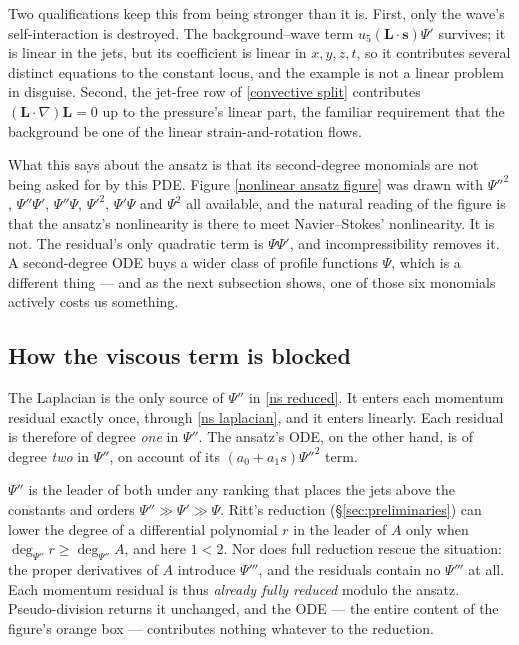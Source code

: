 \documentclass{article}
\theoremstyle{definition}
\theoremstyle{plain}
\begin{document}
\begin{nsexample}
Two qualifications keep this from being stronger than it is.  First, only the
wave's self-interaction is destroyed.  The background--wave term
$u_5(\mathbf{L}\cdot\mathbf{s})\Psi'$ survives; it is linear in the jets, but
its coefficient is linear in $x,y,z,t$, so it contributes several distinct
equations to the constant locus, and the example is not a linear problem in
disguise.  Second, the jet-free row of \eqref{convective split} contributes
$(\mathbf{L}\cdot\nabla)\mathbf{L} = 0$ up to the pressure's linear part, the
familiar requirement that the background be one of the linear
strain-and-rotation flows.

What this says about the ansatz is that its second-degree monomials are not
being asked for by this PDE.  Figure \ref{nonlinear ansatz figure} was drawn
with $\Psi''^2$, $\Psi''\Psi'$, $\Psi''\Psi$, $\Psi'^2$, $\Psi'\Psi$ and
$\Psi^2$ all available, and the natural reading of the figure is that the
ansatz's nonlinearity is there to meet Navier--Stokes' nonlinearity.  It is
not.  The residual's only quadratic term is $\Psi\Psi'$, and incompressibility
removes it.  A second-degree ODE buys a wider class of profile functions
$\Psi$, which is a different thing --- and as the next subsection shows, one of
those six monomials actively costs us something.

\subsection{How the viscous term is blocked}
\label{ns viscous block}

The Laplacian is the only source of $\Psi''$ in \eqref{ns reduced}.  It enters
each momentum residual exactly once, through \eqref{ns laplacian}, and it enters
linearly.  Each residual is therefore of degree {\it one} in $\Psi''$.  The
ansatz's ODE, on the other hand, is of degree {\it two} in $\Psi''$, on account
of its $(a_0 + a_1 s)\Psi''^2$ term.

$\Psi''$ is the leader of both under any ranking that places the jets above the
constants and orders $\Psi'' \gg \Psi' \gg \Psi$.  Ritt's reduction
(\S\ref{sec:preliminaries}) can lower the degree of a differential polynomial
$r$ in the leader of $A$ only when $\deg_{\Psi''} r \ge \deg_{\Psi''} A$, and
here $1 < 2$.  Nor does full reduction rescue the situation: the proper
derivatives of $A$ introduce $\Psi'''$, and the residuals contain no $\Psi'''$
at all.  Each momentum residual is thus {\it already fully reduced} modulo the
ansatz.  Pseudo-division returns it unchanged, and the ODE --- the entire
content of the figure's orange box --- contributes nothing whatever to the
reduction.


\end{nsexample}
\end{document}
